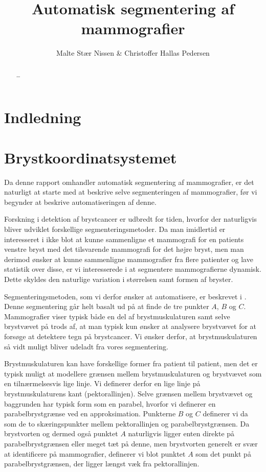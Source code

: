 \documentclass[11pt,a4paper]{article}
\title{Automatisk segmentering af mammografier}
\author{Malte Stær Nissen \& Christoffer Hallas Pedersen}
\begin{document}

\newpage
\clearpage
{}
\tableofcontents

\newpage

\begin{abstract}
\ldots
\end{abstract}

\newpage

\clearpage
{}

\section{Indledning}

\section{Brystkoordinatsystemet}
Da denne rapport omhandler automatisk segmentering af mammografier, er det naturligt at starte med at beskrive selve segmenteringen af mammografier, før vi begynder at beskrive automatiseringen af denne.

Forskning i detektion af brystcancer er udbredt for tiden, hvorfor der naturligvis bliver udviklet forskellige segmenteringsmetoder. Da man imidlertid er interesseret i ikke blot at kunne sammenligne et mammografi for en patients venstre bryst med det tilsvarende mammografi for det højre bryst, men man derimod ønsker at kunne sammenligne mammografier fra flere patienter og lave statistik over disse, er vi interesserede i at segmentere mammografierne dynamisk. Dette skyldes den naturlige variation i størrelsen samt formen af bryster.

Segmenteringsmetoden, som vi derfor ønsker at automatisere, er beskrevet i \cite{brandtetal}. Denne segmentering går helt basalt ud på at finde de tre punkter $A$, $B$ og $C$. Mammografier viser typisk både en del af brystmuskulaturen samt selve brystvævet på trods af, at man typisk kun ønsker at analysere brystvævet for at forsøge at detektere tegn på brystcancer. Vi ønsker derfor, at brystmuskulaturen så vidt muligt bliver udeladt fra vores segmentering. 

Brystmuskulaturen kan have forskellige former fra patient til patient, men det er typisk muligt at modellere grænsen mellem brystmuskulaturen og brystvævet som en tilnærmelsesvis lige linje. Vi definerer derfor en lige linje på brystmuskulaturens kant (pektorallinjen). Selve grænsen mellem brystvævet og baggrunden har typisk form som en parabel, hvorfor vi definerer en parabelbrystgrænse ved en approksimation. Punkterne $B$ og $C$ definerer vi da som de to skæringspunkter mellem pektorallinjen og parabelbrystgrænsen. Da brystvorten og dermed også punktet $A$ naturligvis ligger enten direkte på parabelbrystgrænsen eller meget tæt på denne, men brystvorten generelt er svær at identificere på mammografier, definerer vi blot punktet $A$ som det punkt på parabelbrystgrænsen, der ligger længst væk fra pektorallinjen.
\end{document}
